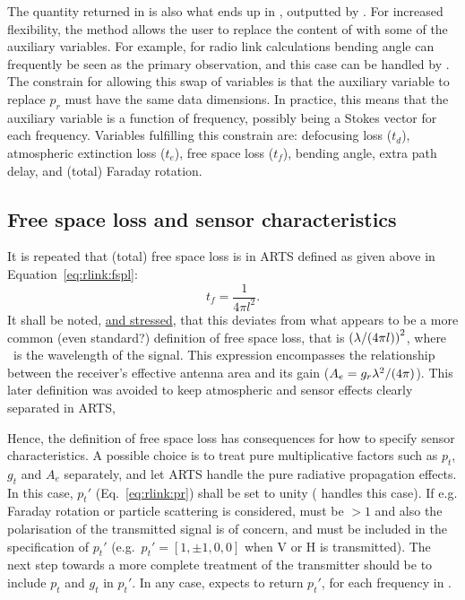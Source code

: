The quantity returned in  is also what ends up in
, outputted by . For increased flexibility, the
method  allows the user to replace the content
of  with some of the auxiliary variables. For example, for radio
link calculations bending angle can frequently be seen as the primary
observation, and this case can be handled by .
The constrain for allowing this swap of variables is that the auxiliary
variable to replace $p_r$ must have the same data dimensions. In practice, this
means that the auxiliary variable is a function of frequency, possibly being a
Stokes vector for each frequency. Variables fulfilling this constrain are:
defocusing loss ($t_d$), atmospheric extinction loss ($t_e$), free space loss
($t_f$), bending angle, extra path delay, and (total) Faraday rotation.


\subsection{Free space loss and sensor characteristics}
\label{sec:rlinks:free}

It is repeated that (total) free space loss is in ARTS defined as given
above in Equation~\ref{eq:rlink:fspl}:
\begin{displaymath}
  t_f = \frac{1}{4\pi l^2}.
\end{displaymath}
It shall be noted, \underline{and stressed}, that this deviates from what
appears to be a more common (even standard?) definition of free space loss,
that is $\left(\lambda/(4 \pi l)\right)^2$, where \Wvl\ is the wavelength of the
signal. This expression encompasses the relationship between the receiver's
effective antenna area and its gain ($A_e=g_r\lambda^2/(4\pi)$). This later
definition was avoided to keep atmospheric and sensor effects clearly separated
in ARTS,

Hence, the definition of free space loss has consequences for how to specify
sensor characteristics. A possible choice is to treat pure multiplicative
factors such as $p_t$, $g_t$ and $A_e$ separately, and let ARTS handle the pure
radiative propagation effects. In this case, $p_t'$ (Eq.~\ref{eq:rlink:pr})
shall be set to unity ( handles this case). If
e.g. Faraday rotation or particle scattering is considered,
 must be $>1$ and also the polarisation of the
transmitted signal is of concern, and must be included in the specification of
$p_t'$ (e.g.\ $p_t'=[1,\pm1,0,0]$ when V or H is transmitted). The next step
towards a more complete treatment of the transmitter should be to include $p_t$
and $g_t$ in $p_t'$. In any case,  expects
 to return $p_t'$, for each frequency in
.

